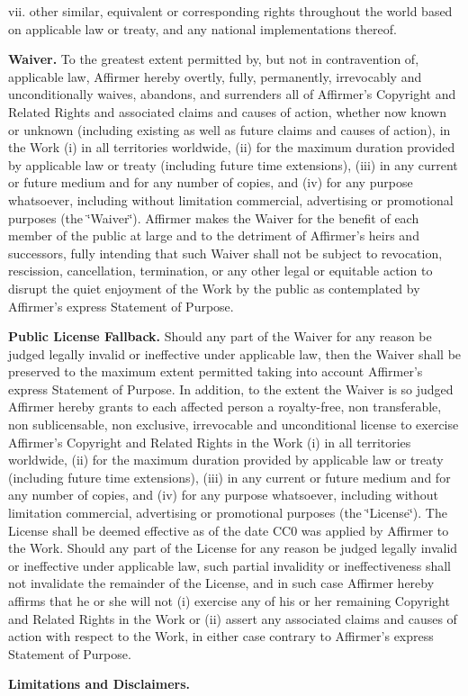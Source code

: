 \begin{DoxyEnumerate}
vii. other similar, equivalent or corresponding rights throughout the world based on applicable law or treaty, and any national implementations thereof.
\item {\bfseries Waiver.} To the greatest extent permitted by, but not in contravention of, applicable law, Affirmer hereby overtly, fully, permanently, irrevocably and unconditionally waives, abandons, and surrenders all of Affirmer's Copyright and Related Rights and associated claims and causes of action, whether now known or unknown (including existing as well as future claims and causes of action), in the Work (i) in all territories worldwide, (ii) for the maximum duration provided by applicable law or treaty (including future time extensions), (iii) in any current or future medium and for any number of copies, and (iv) for any purpose whatsoever, including without limitation commercial, advertising or promotional purposes (the \char`\"{}\+Waiver\char`\"{}). Affirmer makes the Waiver for the benefit of each member of the public at large and to the detriment of Affirmer's heirs and successors, fully intending that such Waiver shall not be subject to revocation, rescission, cancellation, termination, or any other legal or equitable action to disrupt the quiet enjoyment of the Work by the public as contemplated by Affirmer's express Statement of Purpose.
\item {\bfseries Public License Fallback.} Should any part of the Waiver for any reason be judged legally invalid or ineffective under applicable law, then the Waiver shall be preserved to the maximum extent permitted taking into account Affirmer's express Statement of Purpose. In addition, to the extent the Waiver is so judged Affirmer hereby grants to each affected person a royalty-\/free, non transferable, non sublicensable, non exclusive, irrevocable and unconditional license to exercise Affirmer's Copyright and Related Rights in the Work (i) in all territories worldwide, (ii) for the maximum duration provided by applicable law or treaty (including future time extensions), (iii) in any current or future medium and for any number of copies, and (iv) for any purpose whatsoever, including without limitation commercial, advertising or promotional purposes (the \char`\"{}\+License\char`\"{}). The License shall be deemed effective as of the date C\+C0 was applied by Affirmer to the Work. Should any part of the License for any reason be judged legally invalid or ineffective under applicable law, such partial invalidity or ineffectiveness shall not invalidate the remainder of the License, and in such case Affirmer hereby affirms that he or she will not (i) exercise any of his or her remaining Copyright and Related Rights in the Work or (ii) assert any associated claims and causes of action with respect to the Work, in either case contrary to Affirmer's express Statement of Purpose.
\item {\bfseries Limitations and Disclaimers.}


\end{DoxyEnumerate}
